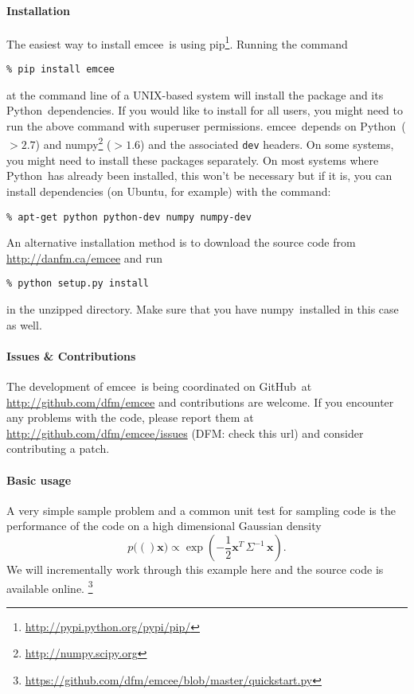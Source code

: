 \documentclass[12pt,preprint]{aastex}
\newcommand{\project}[1]{{\sffamily #1}}
\newcommand{\Python}{\project{Python}}
\newcommand{\numpy}{\project{numpy}}
\newcommand{\Ubuntu}{\project{Ubuntu}}
\newcommand{\github}{\project{GitHub}}
\newcommand{\pip}{\project{pip}}
\newcommand{\thisplain}{emcee}
\newcommand{\this}{\project{\thisplain}}
\newcommand{\eqlabel}[1]{\label{eq:#1}}
\newcommand{\pr}[1]{\ensuremath{p(#1)}}
\begin{document}
\paragraph{Installation}

The easiest way to install \this~is using
\pip\footnote{\url{http://pypi.python.org/pypi/pip/}}. Running the command
\begin{lstlisting}
% pip install emcee
\end{lstlisting}
at the command line of a UNIX-based system will install the package and its
\Python~dependencies. If you would like to install for all users, you might
need to run the above command with superuser permissions. \this~depends on
\Python~($>2.7$) and \numpy\footnote{\url{http://numpy.scipy.org}} ($>1.6$)
and the associated \texttt{dev} headers. On some systems, you might need to
install these packages separately. On most systems where \Python~has already
been installed, this won't be necessary but if it is, you can install
dependencies (on \Ubuntu, for example) with the command:
\begin{lstlisting}
% apt-get python python-dev numpy numpy-dev
\end{lstlisting}

An alternative installation method is to download the source code from
\url{http://danfm.ca/emcee} and run
\begin{lstlisting}
% python setup.py install
\end{lstlisting}
in the unzipped directory. Make sure that you have \numpy~installed in this
case as well.

\paragraph{Issues \& Contributions}

The development of \this~is being coordinated on \github~at
\url{http://github.com/dfm/emcee} and contributions are welcome. If you
encounter any problems with the code, please report them at
\url{http://github.com/dfm/emcee/issues} (DFM: check this url) and consider
contributing a patch.

\paragraph{Basic usage}

A very simple sample problem and a common unit test for sampling code is
the performance of the code on a high dimensional Gaussian density
\begin{equation}\eqlabel{mgauss}
    \pr (\mathbf{x}) \propto \exp\left ( -\frac{1}{2} \mathbf{x}^T \,
                                \Sigma^{-1} \, \mathbf{x} \right ).
\end{equation}
We will incrementally work through this example here and the source code
is available online.%
\footnote{\url{https://github.com/dfm/emcee/blob/master/quickstart.py}}
\end{document}
